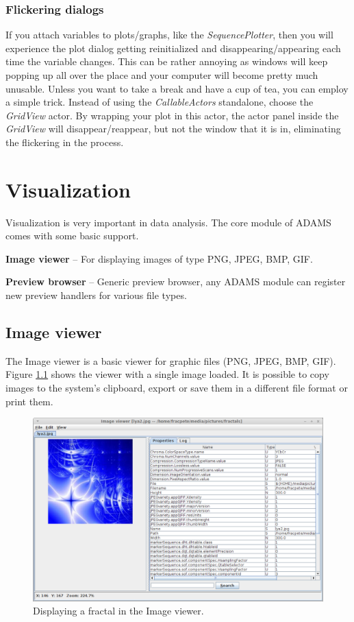 \subsection{Flickering dialogs}
If you attach variables to plots/graphs, like the \textit{SequencePlotter},
then you will experience the plot dialog getting reinitialized and
disappearing/appearing each time the variable changes. This can be rather
annoying as windows will keep popping up all over the place and your
computer will become pretty much unusable. Unless you want to take a break
and have a cup of tea, you can employ a simple trick. Instead of using the
\textit{CallableActors} standalone, choose the \textit{GridView} actor.
By wrapping your plot in this actor, the actor panel inside the \textit{GridView}
will disappear/reappear, but not the window that it is in, eliminating the
flickering in the process.



\chapter{Visualization}
Visualization is very important in data analysis. The core module of ADAMS
comes with some basic support.
\begin{tight_itemize}
	\item \textbf{Image viewer} -- For displaying images of type PNG, JPEG, BMP,
	GIF.
	\item \textbf{Preview browser} -- Generic preview browser, any ADAMS module can
	register new preview handlers for various file types.
\end{tight_itemize}

\section{Image viewer}
The Image viewer is a basic viewer for graphic files (PNG, JPEG, BMP, GIF).
Figure \ref{imageviewer1} shows the viewer with a single image loaded. It is
possible to copy images to the system's clipboard, export or save them in a
different file format or print them.

\begin{figure}[htb]
  \centering
  \includegraphics[width=12.0cm]{images/imageviewer1.png}
  \caption{Displaying a fractal in the Image viewer.}
  \label{imageviewer1}
\end{figure}

